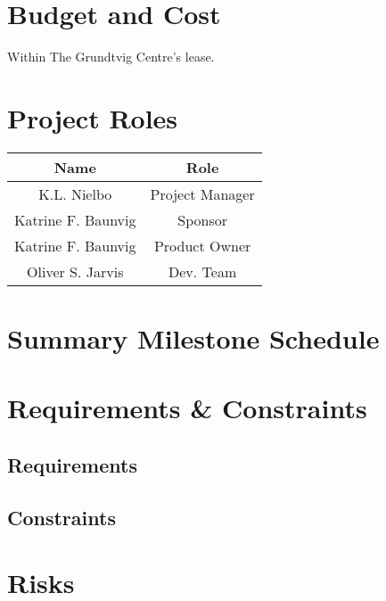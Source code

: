 \documentclass[12pt]{charter}
\begin{document}
\section*{Budget and Cost}
\label{sec:budgetcost}
Within The Grundtvig Centre's lease.

\section*{Project Roles}
\label{sec:roles}
\begin{table}[h]
  \label{tbl:roles}
  \begin{center}
    \begin{tabular}{c|c}
      Name & Role\\\hline
      K.L. Nielbo & Project Manager\\\hline
      Katrine F. Baunvig & Sponsor\\\hline
      Katrine F. Baunvig & Product Owner\\\hline
      Oliver S. Jarvis & Dev. Team\\\hline
    \end{tabular}
  \end{center}
\end{table}

\section*{Summary Milestone Schedule}
\label{sec:milestones}

\section*{Requirements \& Constraints}
\label{sec:require-n-constrain}
	\subsection*{Requirements}
	\label{subsec:requirements}
	
	\subsection*{Constraints}
	\label{subsec:constraints}

\section*{Risks}
\label{sec:risks}

\end{document}
